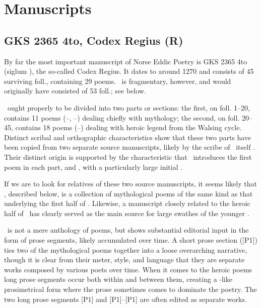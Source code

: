 \section{Manuscripts}

\subsection{GKS 2365 4to, Codex Regius (R)}

By far the most important manuscript of Norse Eddic Poetry is GKS 2365 4to (siglum \Regius), the so-called Codex Regius.  It dates to around 1270 and consists of 45 surviving foll., containing 29 poems.  \Regius\ is fragmentary, however, and would originally have consisted of 53 foll.; see below.

\Regius\ ought properly to be divided into two parts or sections: the first, on foll. 1--20, contains 11 poems (--,  --) dealing chiefly with mythology; the second, on foll. 20--45, contains 18 poems (--) dealing with heroic legend from the Walsing cycle.
Distinct scribal and orthographic characteristics show that these two parts have been copied from two separate source manuscripts, likely by the scribe of \Regius\ itself \parencite[esp.~pp.~160--163]{Lindblad1980}.  Their distinct origin is supported by the characteristic that \Regius\ introduces the first poem in each part,  and , with a particularly large initial \parencite[166]{Lindblad1980}.

If we are to look for relatives of these two source manuscripts, it seems likely that \AM, described below, is a collection of mythological poems of the same kind as that underlying the first half of \Regius.  Likewise, a manuscript closely related to the heroic half of \Regius\ has clearly served as the main source for large swathes of the younger \VolsungaSaga.

\Regius\ is not a mere anthology of poems, but shows substantial editorial input in the form of prose segments, likely accumulated over time.  A short prose section ([P1]) ties two of the mythological poems together into a loose overarching narrative, though it is clear from their meter, style, and language that they are separate works composed by various poets over time.  When it comes to the heroic poems long prose segments occur both within and between them, creating a -like prosimetrical form where the prose sometimes comes to dominate the poetry.  The two long prose segments [P1] and [P1]--[P1] are often edited as separate works.


